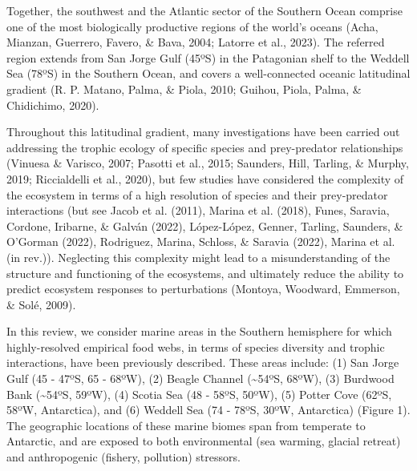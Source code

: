 \documentclass[
]{article}
\begin{document}
Together, the southwest and the Atlantic sector of the Southern Ocean
comprise one of the most biologically productive regions of the world's
oceans (Acha, Mianzan, Guerrero, Favero, \& Bava, 2004; Latorre et al.,
2023). The referred region extends from San Jorge Gulf (45ºS) in the
Patagonian shelf to the Weddell Sea (78ºS) in the Southern Ocean, and
covers a well-connected oceanic latitudinal gradient (R. P. Matano,
Palma, \& Piola, 2010; Guihou, Piola, Palma, \& Chidichimo, 2020).

Throughout this latitudinal gradient, many investigations have been
carried out addressing the trophic ecology of specific species and
prey-predator relationships (Vinuesa \& Varisco, 2007; Pasotti et al.,
2015; Saunders, Hill, Tarling, \& Murphy, 2019; Riccialdelli et al.,
2020), but few studies have considered the complexity of the ecosystem
in terms of a high resolution of species and their prey-predator
interactions (but see Jacob et al. (2011), Marina et al. (2018), Funes,
Saravia, Cordone, Iribarne, \& Galván (2022), López-López, Genner,
Tarling, Saunders, \& O'Gorman (2022), Rodriguez, Marina, Schloss, \&
Saravia (2022), Marina et al. (in rev.)). Neglecting this complexity
might lead to a misunderstanding of the structure and functioning of the
ecosystems, and ultimately reduce the ability to predict ecosystem
responses to perturbations (Montoya, Woodward, Emmerson, \& Solé, 2009).

In this review, we consider marine areas in the Southern hemisphere for
which highly-resolved empirical food webs, in terms of species diversity
and trophic interactions, have been previously described. These areas
include: (1) San Jorge Gulf (45 - 47ºS, 65 - 68ºW), (2) Beagle Channel
(\textasciitilde54ºS, 68ºW), (3) Burdwood Bank (\textasciitilde54ºS,
59ºW), (4) Scotia Sea (48 - 58ºS, 50ºW), (5) Potter Cove (62ºS, 58ºW,
Antarctica), and (6) Weddell Sea (74 - 78ºS, 30ºW, Antarctica) (Figure
1). The geographic locations of these marine biomes span from temperate
to Antarctic, and are exposed to both environmental (sea warming,
glacial retreat) and anthropogenic (fishery, pollution) stressors.
\end{document}
